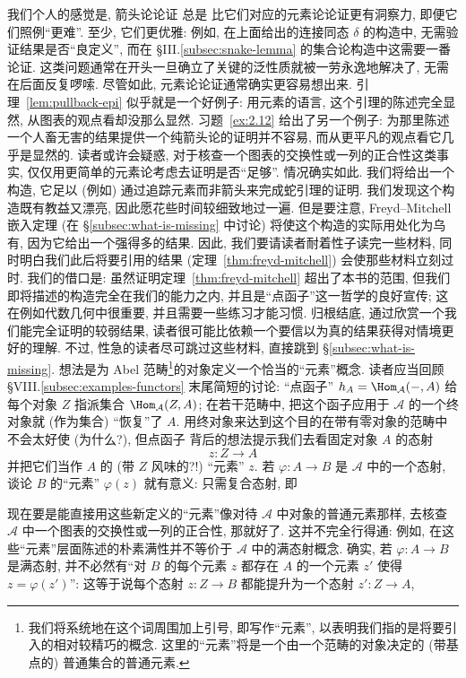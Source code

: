 我们个人的感觉是, 箭头论论证 总是 比它们对应的元素论论证更有洞察力, 即便它们照例``更难''. 至少, 它们更优雅: 例如, 在上面给出的连接同态 $\delta$ 的构造中, 无需验证结果是否``良定义'', 而在 §III.\ref{subsec:snake-lemma} 的集合论构造中这需要一番论证. 这类问题通常在开头一旦确立了关键的泛性质就被一劳永逸地解决了, 无需在后面反复啰嗦.
尽管如此, 元素论论证通常确实更容易想出来. 引理~\ref{lem:pullback-epi} 似乎就是一个好例子: 用元素的语言, 这个引理的陈述完全显然, 从图表的观点看却没那么显然. 习题~\ref{ex:2.12} 给出了另一个例子: 为那里陈述一个人畜无害的结果提供一个纯箭头论的证明并不容易, 而从更平凡的观点看它几乎是显然的. 读者或许会疑惑, 对于核查一个图表的交换性或一列的正合性这类事实, 仅仅用更简单的元素论考虑去证明是否``足够''.
情况确实如此. 我们将给出一个构造, 它足以 (例如) 通过追踪元素而非箭头来完成蛇引理的证明. 我们发现这个构造既有教益又漂亮, 因此愿花些时间较细致地过一遍. 但是要注意, Freyd–Mitchell 嵌入定理 (在 \S\ref{subsec:what-is-missing} 中讨论) 将使这个构造的实际用处化为乌有, 因为它给出一个强得多的结果. 因此, 我们要请读者耐着性子读完一些材料, 同时明白我们此后将要引用的结果 (定理~\ref{thm:freyd-mitchell}) 会使那些材料立刻过时. 我们的借口是: 虽然证明定理~\ref{thm:freyd-mitchell} 超出了本书的范围, 但我们即将描述的构造完全在我们的能力之内, 并且是``点函子''这一哲学的良好宣传; 这在例如代数几何中很重要, 并且需要一些练习才能习惯. 归根结底, 通过欣赏一个我们能完全证明的较弱结果, 读者很可能比依赖一个要信以为真的结果获得对情境更好的理解. 不过, 性急的读者尽可跳过这些材料, 直接跳到 \S\ref{subsec:what-is-missing}.
想法是为 Abel 范畴\footnote{我们将系统地在这个词周围加上引号, 即写作``元素'', 以表明我们指的是将要引入的相对较精巧的概念. 这里的``元素''将是一个由一个范畴的对象决定的 (带基点的) 普通集合的普通元素.}的对象定义一个恰当的``元素''概念. 读者应当回顾 §VIII.\ref{subsec:examples-functors} 末尾简短的讨论: ``点函子'' $h_A=\Hom_{\mathcal{A}}(-,A)$ 给每个对象 $Z$ 指派集合 $\Hom_{\mathcal{A}}(Z,A)$; 在若干范畴中, 把这个函子应用于 $\mathcal{A}$ 的一个终对象就 (作为集合) ``恢复''了 $A$. 用终对象来达到这个目的在带有零对象的范畴中不会太好使 (为什么?), 但点函子 背后的想法提示我们去看固定对象 $A$ 的态射
\[
z:Z\to A
\]
并把它们当作 $A$ 的 (带 $Z$ 风味的?!) ``元素'' $z$. 若 $\varphi:A\to B$ 是 $\mathcal{A}$ 中的一个态射, 谈论 $B$ 的``元素'' $\varphi(z)$ 就有意义: 只需复合态射, 即
\begin{center}
\end{center}
现在要是能直接用这些新定义的``元素''像对待 $\mathcal{A}$ 中对象的普通元素那样, 去核查 $\mathcal{A}$ 中一个图表的交换性或一列的正合性, 那就好了. 这并不完全行得通: 例如, 在这些``元素''层面陈述的朴素满性并不等价于 $\mathcal{A}$ 中的满态射概念. 确实, 若 $\varphi:A\to B$ 是满态射, 并不必然有``对 $B$ 的每个元素 $z$ 都存在 $A$ 的一个元素 $z'$ 使得 $z=\varphi(z')$'': 这等于说每个态射 $z:Z\to B$ 都能提升为一个态射 $z':Z\to A$,
